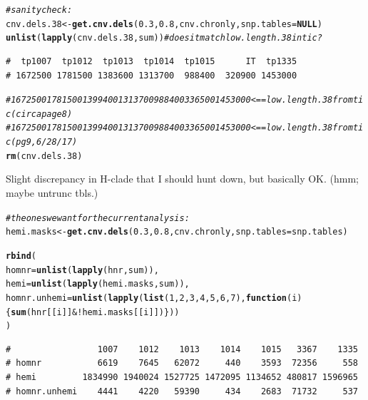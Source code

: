 \documentclass{article}\usepackage[]{graphicx}\usepackage[]{color}
\makeatletter
\newcommand{\hlnum}[1]{\textcolor[rgb]{0.686,0.059,0.569}{#1}}%
\newcommand{\hlcom}[1]{\textcolor[rgb]{0.678,0.584,0.686}{\textit{#1}}}%
\newcommand{\hlopt}[1]{\textcolor[rgb]{0,0,0}{#1}}%
\newcommand{\hlstd}[1]{\textcolor[rgb]{0.345,0.345,0.345}{#1}}%
\newcommand{\hlkwa}[1]{\textcolor[rgb]{0.161,0.373,0.58}{\textbf{#1}}}%
\newcommand{\hlkwb}[1]{\textcolor[rgb]{0.69,0.353,0.396}{#1}}%
\newcommand{\hlkwc}[1]{\textcolor[rgb]{0.333,0.667,0.333}{#1}}%
\newcommand{\hlkwd}[1]{\textcolor[rgb]{0.737,0.353,0.396}{\textbf{#1}}}%
\newenvironment{kframe}{%
 \def\at@end@of@kframe{}%
 \ifinner\ifhmode%
  \def\at@end@of@kframe{\end{minipage}}%
  \begin{minipage}{\columnwidth}%
 \fi\fi%
 \def\FrameCommand##1{\hskip\@totalleftmargin \hskip-\fboxsep
 \colorbox{shadecolor}{##1}\hskip-\fboxsep
     \hskip-\linewidth \hskip-\@totalleftmargin \hskip\columnwidth}%
 \MakeFramed {\advance\hsize-\width
   \@totalleftmargin\z@ \linewidth\hsize
   \@setminipage}}%
 {\par\unskip\endMakeFramed%
 \at@end@of@kframe}
\newenvironment{knitrout}{}{} %
\makeatother
\begin{document}
\begin{knitrout}
\begin{kframe}
\begin{alltt}
\hlcom{# sanity check:}
\hlstd{cnv.dels.38} \hlkwb{<-} \hlkwd{get.cnv.dels}\hlstd{(}\hlnum{0.3}\hlstd{,} \hlnum{0.8}\hlstd{, cnv.chronly,} \hlkwc{snp.tables} \hlstd{=} \hlkwa{NULL}\hlstd{)}
\hlkwd{unlist}\hlstd{(}\hlkwd{lapply}\hlstd{(cnv.dels.38,sum))} \hlcom{# does it match low.length.38 in tic ?}
\end{alltt}
\begin{verbatim}
#  tp1007  tp1012  tp1013  tp1014  tp1015      IT  tp1335 
# 1672500 1781500 1383600 1313700  988400  320900 1453000
\end{verbatim}
\begin{alltt}
\hlcom{# 1672500 1781500 1399400 1313700 988400 336500 1453000 <== low.length.38 from tic (circa page 8)}
\hlcom{# 1672500 1781500 1399400 1313700 988400 336500 1453000 <== low.length.38 from tic (pg9, 6/28/17)}
\hlkwd{rm}\hlstd{(cnv.dels.38)}
\end{alltt}
\end{kframe}
\end{knitrout}

Slight discrepancy in H-clade that I should hunt down, but basically OK. (hmm; maybe untrunc tbls.)

\begin{knitrout}\footnotesize
{}\color{fgcolor}\begin{kframe}
\begin{alltt}
\hlcom{# the ones we want for the current analysis:}
\hlstd{hemi.masks} \hlkwb{<-} \hlkwd{get.cnv.dels}\hlstd{(}\hlnum{0.3}\hlstd{,} \hlnum{0.8}\hlstd{, cnv.chronly,} \hlkwc{snp.tables}\hlstd{=snp.tables)}

\hlkwd{rbind}\hlstd{(}
  \hlkwc{homnr}        \hlstd{=} \hlkwd{unlist}\hlstd{(}\hlkwd{lapply}\hlstd{(hnr,sum)),}
  \hlkwc{hemi}         \hlstd{=} \hlkwd{unlist}\hlstd{(}\hlkwd{lapply}\hlstd{(hemi.masks, sum)),}
  \hlkwc{homnr.unhemi} \hlstd{=} \hlkwd{unlist}\hlstd{(}\hlkwd{lapply}\hlstd{(}\hlkwd{list}\hlstd{(}\hlnum{1}\hlstd{,}\hlnum{2}\hlstd{,}\hlnum{3}\hlstd{,}\hlnum{4}\hlstd{,}\hlnum{5}\hlstd{,}\hlnum{6}\hlstd{,}\hlnum{7}\hlstd{),} \hlkwa{function}\hlstd{(}\hlkwc{i}\hlstd{)\{}\hlkwd{sum}\hlstd{(hnr[[i]]} \hlopt{& !}\hlstd{hemi.masks[[i]])\}))}
\hlstd{)}
\end{alltt}
\begin{verbatim}
#                 1007    1012    1013    1014    1015   3367    1335
# homnr           6619    7645   62072     440    3593  72356     558
# hemi         1834990 1940024 1527725 1472095 1134652 480817 1596965
# homnr.unhemi    4441    4220   59390     434    2683  71732     537
\end{verbatim}
\end{kframe}
\end{knitrout}
\end{document}
